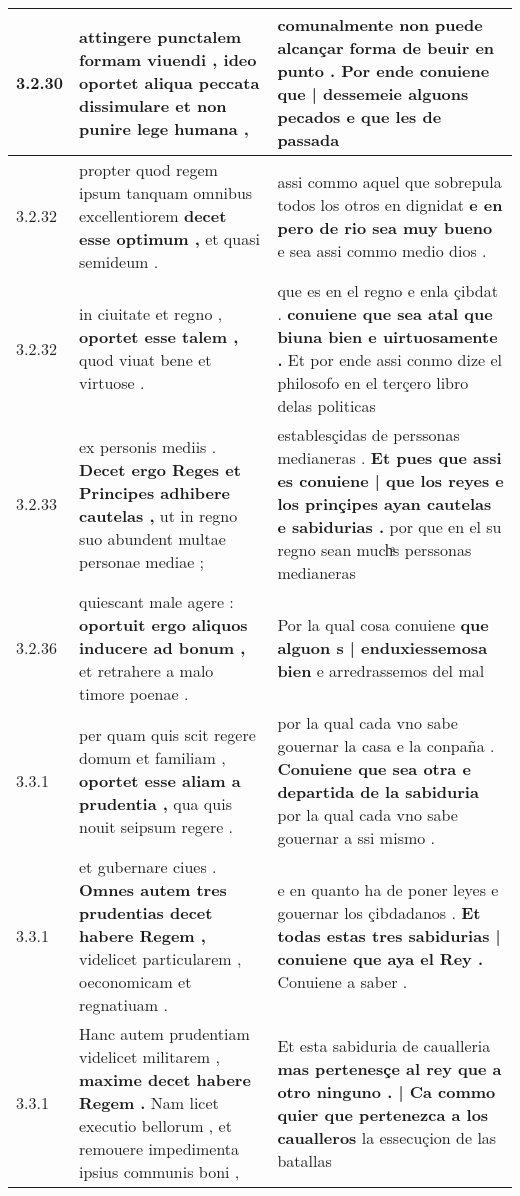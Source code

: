 \begin{tabular}{|p{1cm}|p{6.5cm}|p{6.5cm}|}
3.2.30 & attingere punctalem formam viuendi , \textbf{ ideo oportet aliqua peccata dissimulare } et non punire lege humana , & comunalmente non puede alcançar forma de beuir en punto . \textbf{ Por ende conuiene que | dessemeie alguons pecados } e que les de passada \\\hline
3.2.32 & propter quod regem ipsum tanquam omnibus excellentiorem \textbf{ decet esse optimum , } et quasi semideum . & assi commo aquel que sobrepula todos los otros en dignidat \textbf{ e en pero de rio sea muy bueno } e sea assi commo medio dios . \\\hline
3.2.32 & in ciuitate et regno , \textbf{ oportet esse talem , } quod viuat bene et virtuose . & que es en el regno e enla çibdat . \textbf{ conuiene que sea atal que biuna bien e uirtuosamente . } Et por ende assi conmo dize el philosofo en el terçero libro delas politicas \\\hline
3.2.33 & ex personis mediis . \textbf{ Decet ergo Reges et Principes adhibere cautelas , } ut in regno suo abundent multae personae mediae ; & establesçidas de perssonas medianeras . \textbf{ Et pues que assi es conuiene | que los reyes e los prinçipes ayan cautelas e sabidurias . } por que en el su regno sean muchͣs perssonas medianeras \\\hline
3.2.36 & quiescant male agere : \textbf{ oportuit ergo aliquos inducere ad bonum , } et retrahere a malo timore poenae . & Por la qual cosa conuiene \textbf{ que alguon s | enduxiessemosa bien } e arredrassemos del mal \\\hline
3.3.1 & per quam quis scit regere domum et familiam , \textbf{ oportet esse aliam a prudentia , } qua quis nouit seipsum regere . & por la qual cada vno sabe gouernar la casa e la conpaña . \textbf{ Conuiene que sea otra e departida de la sabiduria } por la qual cada vno sabe gouernar a ssi mismo . \\\hline
3.3.1 & et gubernare ciues . \textbf{ Omnes autem tres prudentias decet habere Regem , } videlicet particularem , oeconomicam et regnatiuam . & e en quanto ha de poner leyes e gouernar los çibdadanos . \textbf{ Et todas estas tres sabidurias | conuiene que aya el Rey . } Conuiene a saber . \\\hline
3.3.1 & Hanc autem prudentiam videlicet militarem , \textbf{ maxime decet habere Regem . } Nam licet executio bellorum , et remouere impedimenta ipsius communis boni , & Et esta sabiduria de caualleria \textbf{ mas pertenesçe al rey que a otro ninguno . | Ca commo quier que pertenezca a los caualleros } la essecuçion de las batallas \\\hline

\end{tabular}

